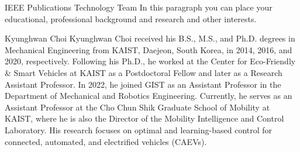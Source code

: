 \documentclass[lettersize,journal]{IEEEtran}
\newcommand*{\template}{template}
\begin{document}
\begin{IEEEbiography}{IEEE Publications Technology Team}
    In this paragraph you can place your educational, professional background and research and other interests.
\end{IEEEbiography}

\begin{IEEEbiography}{Kyunghwan Choi}
    Kyunghwan Choi received his B.S., M.S., and Ph.D. degrees in Mechanical Engineering from KAIST, Daejeon, South Korea, in 2014, 2016, and 2020, respectively. Following his Ph.D., he worked at the Center for Eco-Friendly \& Smart Vehicles at KAIST as a Postdoctoral Fellow and later as a Research Assistant Professor. In 2022, he joined GIST as an Assistant Professor in the Department of Mechanical and Robotics Engineering. Currently, he serves as an Assistant Professor at the Cho Chun Shik Graduate School of Mobility at KAIST, where he is also the Director of the Mobility Intelligence and Control Laboratory. His research focuses on optimal and learning-based control for connected, automated, and electrified vehicles (CAEVs).
\end{IEEEbiography}
\end{document}
